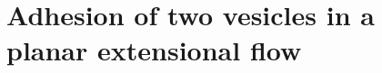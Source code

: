 \documentclass[prf,superscriptaddress,showkeys,longbibliography]{revtex4-1}
\begin{document}
%
%
%
%
%

\section{Adhesion of two vesicles in a planar extensional flow} 
\label{sec:eflow} 
\end{document}
